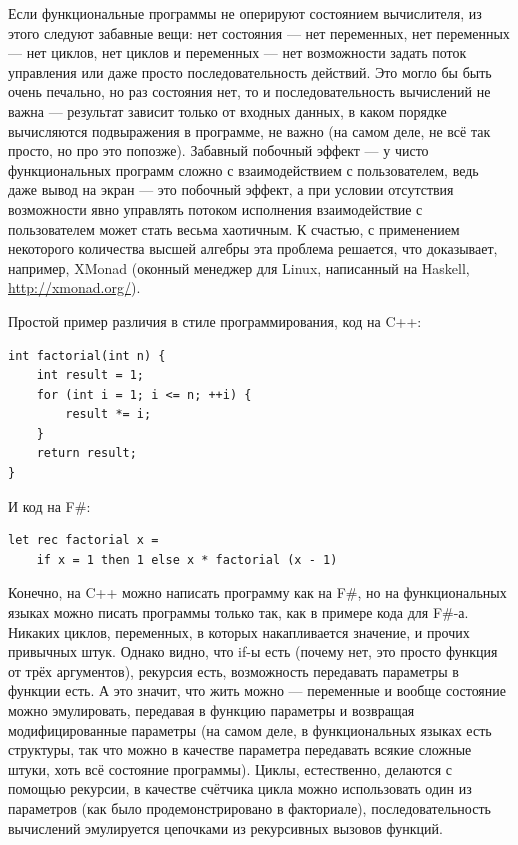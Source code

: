 \documentclass{../../text-style}
\begin{document}
Если функциональные программы не оперируют состоянием вычислителя, из этого следуют забавные вещи: нет состояния --- нет переменных, нет переменных --- нет циклов, нет циклов и переменных --- нет возможности задать поток управления или даже просто последовательность действий. Это могло бы быть очень печально, но раз состояния нет, то и последовательность вычислений не важна --- результат зависит только от входных данных, в каком порядке вычисляются подвыражения в программе, не важно (на самом деле, не всё так просто, но про это попозже). Забавный побочный эффект --- у чисто функциональных программ сложно с взаимодействием с пользователем, ведь даже вывод на экран --- это побочный эффект, а при условии отсутствия возможности явно управлять потоком исполнения взаимодействие с пользователем может стать весьма хаотичным. К счастью, с применением некоторого количества высшей алгебры эта проблема решается, что доказывает, например, XMonad (оконный менеджер для Linux, написанный на Haskell, \url{http://xmonad.org/}).

Простой пример различия в стиле программирования, код на C++:
\begin{verbatim}
int factorial(int n) {
    int result = 1;
    for (int i = 1; i <= n; ++i) {
        result *= i;
    }
    return result;
}
\end{verbatim}

И код на F\#:
\begin{verbatim}
let rec factorial x =
    if x = 1 then 1 else x * factorial (x - 1)
\end{verbatim}

Конечно, на C++ можно написать программу как на F\#, но на функциональных языках можно писать программы только так, как в примере кода для F\#-а. Никаких циклов, переменных, в которых накапливается значение, и прочих привычных штук. Однако видно, что if-ы есть (почему нет, это просто функция от трёх аргументов), рекурсия есть, возможность передавать параметры в функции есть. А это значит, что жить можно --- переменные и вообще состояние можно эмулировать, передавая в функцию параметры и возвращая модифицированные параметры (на самом деле, в функциональных языках есть структуры, так что можно в качестве параметра передавать всякие сложные штуки, хоть всё состояние программы). Циклы, естественно, делаются с помощью рекурсии, в качестве счётчика цикла можно использовать один из параметров (как было продемонстрировано в факториале), последовательность вычислений эмулируется цепочками из рекурсивных вызовов функций.
\end{document}
